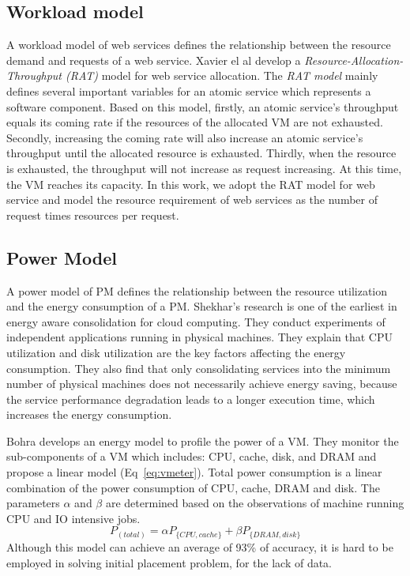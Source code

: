 \subsection{Workload model}
A workload model of web services defines the relationship between the resource demand and requests of a web service.
Xavier el al \cite{Service_1} develop a \textit{Resource-Allocation-Throughput (RAT)} model for web service allocation. The \textit{RAT model} mainly defines several important variables for an atomic service which represents a software component. Based on this model, firstly, an atomic service's throughput equals its coming rate if the resources of the allocated VM are not exhausted. Secondly, increasing the coming rate will also increase an atomic service's throughput until the allocated resource is exhausted. Thirdly, when the resource is exhausted, the throughput will not increase as request increasing. At this time, the VM reaches its capacity. 
In this work, we adopt the RAT model for web service and model the resource requirement of web services as the number of request times resources per request. 

\subsection{Power Model}
A power model of PM defines the relationship between the resource utilization and the energy consumption of a PM.
Shekhar's research \cite{Energy_1} is one of the earliest in energy aware consolidation for cloud computing. They conduct experiments of independent applications running in physical machines. They explain that CPU utilization and disk utilization are the key factors affecting the energy consumption. They also find that only consolidating services into the minimum number of physical machines does not necessarily achieve energy saving, because the service performance degradation leads to a longer execution time, which increases the energy consumption. 

Bohra \cite{Energy_3} develops an energy model to profile the power of a VM. They monitor the sub-components of a VM which includes: CPU, cache, disk, and DRAM and propose a linear model (Eq~\ref{eq:vmeter}). 
Total power consumption is a linear combination of the power consumption of CPU, cache, DRAM and disk. The parameters
$\alpha$ and $\beta$ are determined based on the observations of machine running CPU and IO intensive jobs. 
\begin{equation}
\label{eq:vmeter}
  P_{(total)} = \alpha P_{\{CPU, cache\}} + \beta P_{\{DRAM, disk\}}
\end{equation}
Although this model can achieve an average of 93\% of accuracy, it is hard to be employed in solving initial placement problem, for the lack of data.

